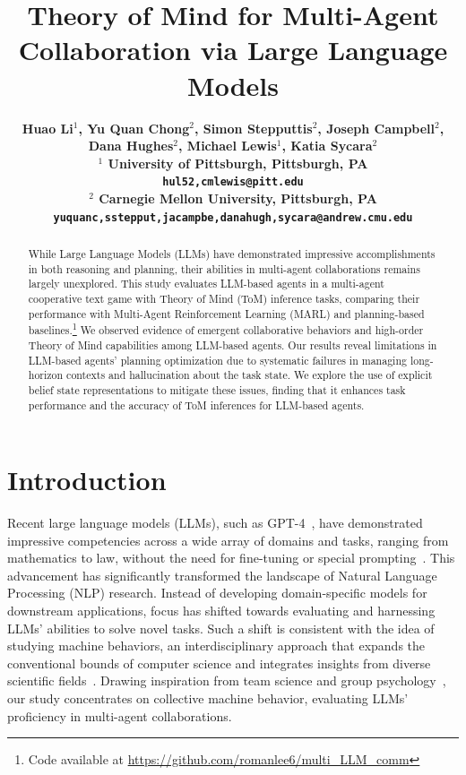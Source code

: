 \documentclass[11pt]{article}
\title{Theory of Mind for Multi-Agent Collaboration via Large Language Models}
\author{\bf
Huao Li$^1$,
Yu Quan Chong$^2$,
Simon Stepputtis$^2$,
Joseph Campbell$^2$,\\
\bf
Dana Hughes$^2$,
Michael Lewis$^1$,
Katia Sycara$^2$
\\
$^1$ University of Pittsburgh, Pittsburgh, PA \\
\texttt{hul52,cmlewis@pitt.edu}\\
$^2$ Carnegie Mellon University, Pittsburgh, PA \\
\texttt{yuquanc,sstepput,jacampbe,danahugh,sycara@andrew.cmu.edu}\\
}
\begin{document}
\maketitle
\begin{abstract}

While Large Language Models (LLMs) have demonstrated impressive accomplishments in both reasoning and planning, their abilities in multi-agent collaborations remains largely unexplored. This study evaluates LLM-based agents in a multi-agent cooperative text game with Theory of Mind (ToM) inference tasks, comparing their performance with Multi-Agent Reinforcement Learning (MARL) and planning-based baselines.\footnote{Code available at \url{https://github.com/romanlee6/multi_LLM_comm}} We observed evidence of emergent collaborative behaviors and high-order Theory of Mind capabilities among LLM-based agents. Our results reveal limitations in LLM-based agents' planning optimization due to systematic failures in managing long-horizon contexts and hallucination about the task state. We explore the use of explicit belief state representations to mitigate these issues, finding that it enhances task performance and the accuracy of ToM inferences for LLM-based agents. 

\end{abstract}

\section{Introduction}


Recent large language models (LLMs), such as GPT-4~\cite{openai2023gpt4}, have demonstrated impressive competencies across a wide array of domains and tasks, ranging from mathematics to law, without the need for fine-tuning or special prompting~\cite{bubeck2023sparks}. This advancement has significantly transformed the landscape of Natural Language Processing (NLP) research. Instead of developing domain-specific models for downstream applications, focus has shifted towards evaluating and harnessing LLMs' abilities to solve novel tasks. Such a shift is consistent with the idea of studying machine behaviors, an interdisciplinary approach that expands the conventional bounds of computer science and integrates insights from diverse scientific fields~\cite{rahwan2019machine}. Drawing inspiration from team science and group psychology~\cite{hagendorff2023machine}, our study concentrates on collective machine behavior, evaluating LLMs' proficiency in multi-agent collaborations.
\end{document}
